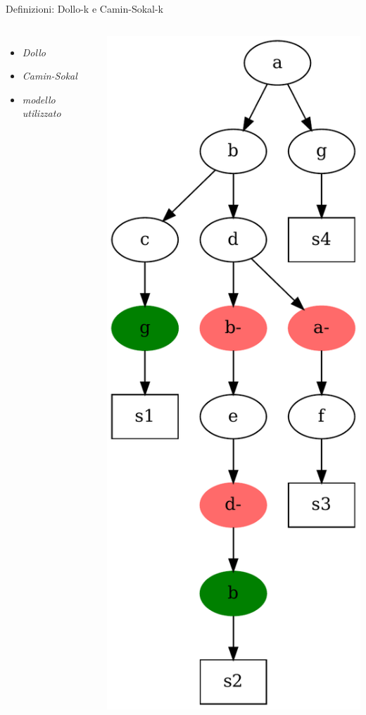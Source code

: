 \documentclass{beamer}
\begin{document}
\begin{tframe}{Definizioni: Dollo-k e Camin-Sokal-k}
  \begin{columns}
  \begin{itemize}
    \item \textit{Dollo}
    \item \textit{Camin-Sokal}
    \item \textit{modello utilizzato}
  \end{itemize}


  \includegraphics[scale = 0.23]{img/tree.pdf}
\end{columns}
\end{tframe}
\end{document}
